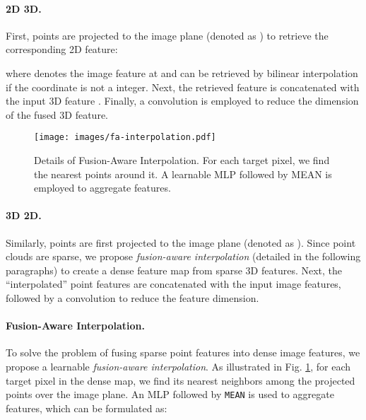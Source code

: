\documentclass[10pt,twocolumn,letterpaper]{article}
\begin{document}
\vspace{-10pt}
\paragraph{2D  3D.} First, points are projected to the image plane (denoted as ) to retrieve the corresponding 2D feature:

where  denotes the image feature at  and can be retrieved by bilinear interpolation if the coordinate is not a integer. Next, the retrieved feature  is concatenated with the input 3D feature . Finally, a  convolution is employed to reduce the dimension of the fused 3D feature.

\begin{figure}[t]
    \centering
    \texttt{[image: images/fa-interpolation.pdf]}
    \vspace{-20pt}
    \caption{Details of Fusion-Aware Interpolation. For each target pixel, we find the  nearest points around it. A learnable MLP followed by MEAN is employed to aggregate features.}
    \vspace{-10pt}
    \label{fig:fa-interpolation}
\end{figure}

\vspace{-10pt}
\paragraph{3D  2D.} Similarly, points are first projected to the image plane (denoted as ). Since point clouds are sparse, we propose \textit{fusion-aware interpolation} (detailed in the following paragraphs) to create a dense feature map  from sparse 3D features. Next, the ``interpolated'' point features are concatenated with the input image features, followed by a  convolution to reduce the feature dimension.

\vspace{-10pt}
\paragraph{Fusion-Aware Interpolation.} To solve the problem of fusing sparse point features into dense image features, we propose a learnable \textit{fusion-aware interpolation}. As illustrated in Fig. \ref{fig:fa-interpolation}, for each target pixel  in the dense map, we find its  nearest neighbors among the projected points over the image plane. An MLP followed by \texttt{MEAN} is used to aggregate features, which can be formulated as:
\end{document}
